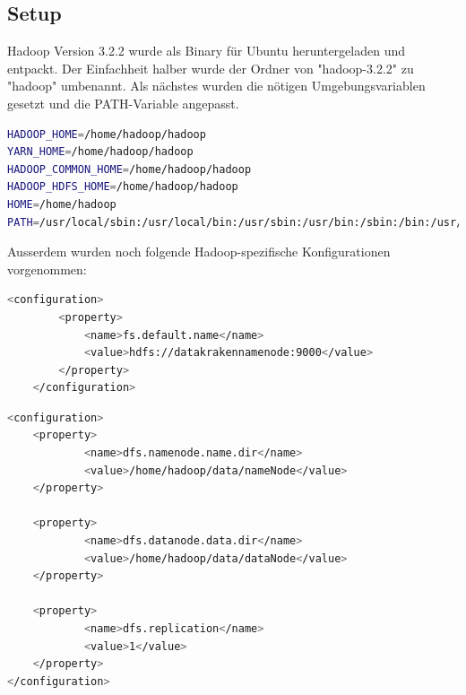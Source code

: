 \documentclass[12pt,oneside,a4paper,parskip]{scrbook}
\begin{document}
\subsection{Setup}
Hadoop Version 3.2.2 wurde als Binary für Ubuntu heruntergeladen und entpackt. Der Einfachheit halber wurde der Ordner von "hadoop-3.2.2" zu "hadoop" umbenannt.
Als nächstes wurden die nötigen Umgebungsvariablen gesetzt und die PATH-Variable angepasst.
\begin{lstlisting}[caption=etc/environment,label=env,language=bash]
HADOOP_HOME=/home/hadoop/hadoop
YARN_HOME=/home/hadoop/hadoop
HADOOP_COMMON_HOME=/home/hadoop/hadoop
HADOOP_HDFS_HOME=/home/hadoop/hadoop
HOME=/home/hadoop
PATH=/usr/local/sbin:/usr/local/bin:/usr/sbin:/usr/bin:/sbin:/bin:/usr/games:/usr/local/games:/snap/bin:/bin:/home/hadoop/hadoop/bin:/home/hadoop/hadoop/sbin:/usr/lib/jvm/java-8-openjdk-amd64/bin:/usr/lib/jvm/java-8-openjdk-amd64/sbin
\end{lstlisting}
Ausserdem wurden noch folgende Hadoop-spezifische Konfigurationen vorgenommen: \newline
\begin{lstlisting}[caption=/hadoop/etc/hadoop/core-site.xml,label=coresitexml,language=bash]
<configuration>
        <property>
            <name>fs.default.name</name>
            <value>hdfs://datakrakennamenode:9000</value>
        </property>
    </configuration>
\end{lstlisting}
\begin{lstlisting}[caption=hadoop/etc/hadoop/hdfs-site.xml,label=hdfssitexml,language=bash]
<configuration>
    <property>
            <name>dfs.namenode.name.dir</name>
            <value>/home/hadoop/data/nameNode</value>
    </property>

    <property>
            <name>dfs.datanode.data.dir</name>
            <value>/home/hadoop/data/dataNode</value>
    </property>

    <property>
            <name>dfs.replication</name>
            <value>1</value>
    </property>
</configuration>
\end{lstlisting}
\end{document}

